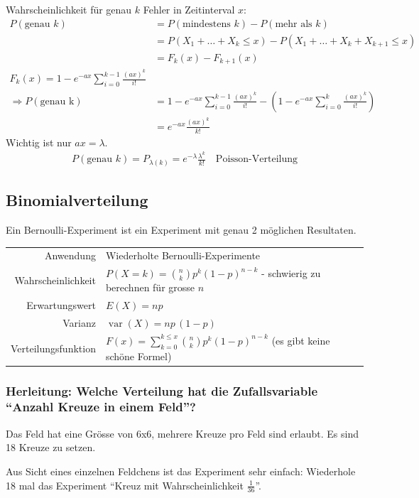 \documentclass[10pt,a4paper]{scrartcl}
\DeclareMathOperator{\var}{var}
\begin{document}
Wahrscheinlichkeit für genau $k$ Fehler in Zeitinterval $x$:
\begin{align*}
P(\text{genau }k) & = P(\text{mindestens } k) - P(\text{mehr als } k) \\
& = P(X_1 + \dots + X_k \le x) - P(X_1 + \dots + X_k + X_{k+1} \le x) \\
& = F_k(x) - F_{k+1}(x) \\
F_k(x) = 1 - e^{-ax}\sum_{i=0}^{k-1} \frac{(ax)^k}{i!} \\
\Rightarrow P(\text{genau k}) &= 1 - e^{-ax} \sum_{i=0}^{k-1} \frac{(ax)^k}{i!} - 
  \left(1 - e^{-ax} \sum_{i=0}^{k} \frac{(ax)^k}{i!}\right) \\
  & = e^{-ax}\frac{(ax)^k}{k!}
\end{align*}
Wichtig ist nur $ax = \lambda$.
\begin{align*}
   P(\text{genau }k) = P_{\lambda(k)} = e^{-\lambda} \frac{\lambda^k}{k!} \quad\text{Poisson-Verteilung} 
\end{align*}
\fi

\subsection{Binomialverteilung}
Ein Bernoulli-Experiment ist ein Experiment mit genau 2 möglichen Resultaten.

\begin{tabular}{r p{\katalogSpaltezwei}}
Anwendung & Wiederholte Bernoulli-Experimente \\
Wahrscheinlichkeit & $P(X=k) = \binom{n}{k} p^k(1-p)^{n-k}$ - schwierig zu berechnen für grosse $n$\\
Erwartungswert & $ E(X) = np $ \\
Varianz & $\var(X) = np\,(1-p) $ \\
Verteilungsfunktion & $F(x) = \sum_{k=0}^{k \le x} \binom{n}{k} p^k(1-p)^{n-k}$ (es gibt keine schöne Formel)
\end{tabular} 

\subsubsection{Herleitung: Welche Verteilung hat die Zufallsvariable ``Anzahl Kreuze in einem Feld''?}

Das Feld hat eine Grösse von 6x6, mehrere Kreuze pro Feld sind erlaubt. Es sind 18 Kreuze zu setzen. 

Aus Sicht eines einzelnen Feldchens ist das Experiment sehr einfach: Wiederhole 18 mal das Experiment ``Kreuz mit Wahrscheinlichkeit $\frac{1}{36}$''.
\end{document}
